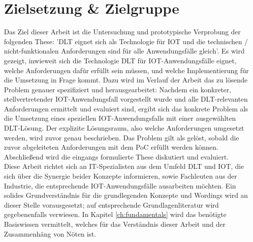 %
%
\section{Zielsetzung \& Zielgruppe}
\label{sec:intro:goal}
Das Ziel dieser Arbeit ist die Untersuchung und prototypische Verprobung der folgenden These: '\ac{DLT} eignet sich als Technologie für \ac{IOT} und die technischen / nicht-funktionalen Anforderungen sind für alle Anwendungsfälle gleich'. Es wird gezeigt, inwieweit sich die Technologie \ac{DLT} für \ac{IOT}-Anwendungsfälle eignet, welche Anforderungen dafür erfüllt sein müssen, und welche Implementierung für die Umsetzung in Frage kommt. Dazu wird im Verlauf der Arbeit das zu lösende Problem genauer spezifiziert und herausgearbeitet: Nachdem ein konkreter, stellvertretender \ac{IOT}-Anwendungsfall vorgestellt wurde und alle \ac{DLT}-relevanten Anforderungen ermittelt und evaluiert sind, ergibt sich das konkrete Problem als die Umsetzung eines speziellen \ac{IOT}-Anwendungsfalls mit einer ausgewählten \ac{DLT}-Lösung. Der explizite Lösungsraum, also welche Anforderungen umgesetzt werden, wird zuvor genau beschrieben. Das Problem gilt als gelöst, sobald die zuvor abgeleiteten Anforderungen mit dem \ac{PoC} erfüllt werden können. Abschließend wird die eingangs formulierte These diskutiert und evaluiert.\\
Diese Arbeit richtet sich an IT-Spezialisten aus dem Umfeld \ac{DLT} und \ac{IOT}, die sich über die Synergie beider Konzepte informieren, sowie Fachleuten aus der Industrie, die entsprechende \ac{IOT}-Anwendungsfälle ausarbeiten möchten. Ein solides Grundverständnis für die grundlegenden Konzepte und Wordings wird an dieser Stelle vorausgesetzt; auf entsprechende Grundlagenliteratur wird gegebenenfalls verwiesen. In Kapitel \ref{ch:fundamentals} wird das benötigte Basiswissen vermittelt, welches für das Verständnis dieser Arbeit und der Zusammenhäng von Nöten ist.

%
%
